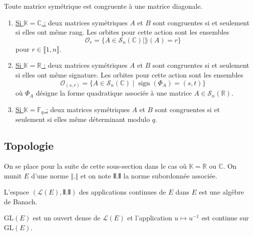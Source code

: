   \begin{theorem}[Spectral]
    Toute matrice symétrique est congruente à une matrice diagonale.
  \end{theorem}

  \begin{theorem}
    \begin{enumerate}[label=(\roman*)]
      \item \uline{Si $\mathbb{K} = \mathbb{C}$ :} deux matrices symétriques $A$ et $B$ sont congruentes si et seulement si elles ont même rang. Les orbites pour cette action sont les ensembles
      \[ \mathcal{O}_r = \{ A \in \mathcal{S}_n(\mathbb{C}) \mid \rang(A) = r \} \]
      pour $r \in \llbracket 1, n \rrbracket$.
      \item \uline{Si $\mathbb{K} = \mathbb{R}$ :} deux matrices symétriques $A$ et $B$ sont congruentes si et seulement si elles ont même signature. Les orbites pour cette action sont les ensembles
      \[ \mathcal{O}_{(s,r)} = \{ A \in \mathcal{S}_n(\mathbb{C}) \mid \operatorname{sign}(\Phi_A) = (s,t) \} \]
      où $\Phi_A$ désigne la forme quadratique associée à une matrice $A \in \mathcal{S}_n(\mathbb{R})$.
      \item \uline{Si $\mathbb{K} = \mathbb{F}_q$ :} deux matrices symétriques $A$ et $B$ sont congruentes si et seulement si elles même déterminant modulo $q$.
    \end{enumerate}
  \end{theorem}

  \subsection{Topologie}


  On se place pour la suite de cette sous-section dans le cas où $\mathbb{K} = \mathbb{R}$ ou $\mathbb{C}$. On munit $E$ d'une norme $\Vert . \Vert$ et on note $\VERT . \VERT$ la norme subordonnée associée.

  \begin{proposition}
    L'espace $(\mathcal{L}(E), \VERT . \VERT)$ des applications continues de $E$ dans $E$ est une algèbre de Banach.
  \end{proposition}

  \begin{theorem}
    $\mathrm{GL}(E)$ est un ouvert dense de $\mathcal{L}(E)$ et l'application $u \mapsto u^{-1}$ est continue sur $\mathrm{GL}(E)$.
  \end{theorem}

